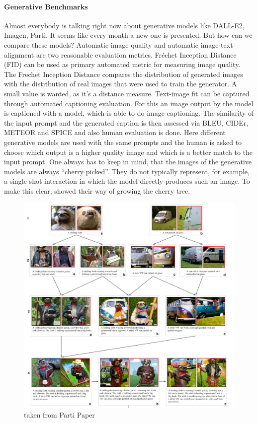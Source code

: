 \documentclass[
]{krantz}
\begin{document}
\hypertarget{generative-benchmarks}{%
\paragraph{Generative Benchmarks}\label{generative-benchmarks}}

Almost everybody is talking right now about generative models like DALL-E2, Imagen, Parti. It seems like every month a new one is presented. But how can we compare these models? Automatic image quality and automatic image-text alignment are two reasonable evaluation metrics. Fréchet Inception Distance (FID) can be used as primary automated metric for measuring image quality. The Frechet Inception Distance compares the distribution of generated images with the distribution of real images that were used to train the generator. A small value is wanted, as it's a distance measure. Text-image fit can be captured through automated captioning evaluation. For this an image output by the model is captioned with a model, which is able to do image captioning. The similarity of the input prompt and the generated caption is then assessed via BLEU, CIDEr, METEOR and SPICE and also human evaluation is done. Here different generative models are used with the same prompts and the human is asked to choose which output is a higher quality image and which is a better match to the input prompt. One always has to keep in mind, that the images of the generative models are always ``cherry picked''. They do not typically represent, for example, a single shot interaction in which the model directly produces such an image. To make this clear, \citet{parti} showed their way of growing the cherry tree.

\begin{figure}
\centering
\includegraphics{figures/01-chapter1/Parti_Growing.png}
\caption{taken from Parti Paper}
\end{figure}
\end{document}
